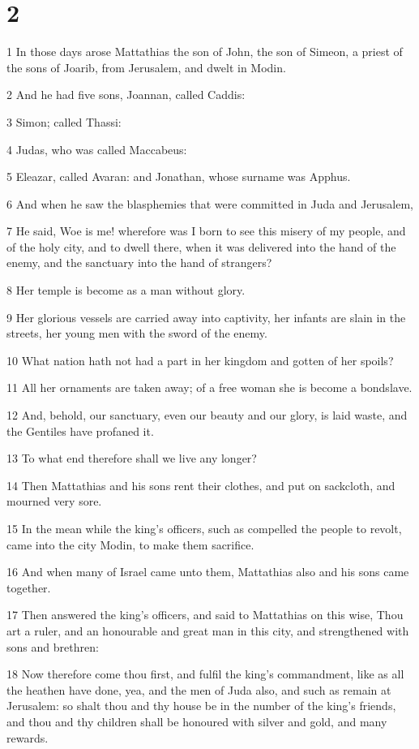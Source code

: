 \chapter{2}

\par 1 In those days arose Mattathias the son of John, the son of Simeon, a priest of the sons of Joarib, from Jerusalem, and dwelt in Modin.
\par 2 And he had five sons, Joannan, called Caddis:
\par 3 Simon; called Thassi:
\par 4 Judas, who was called Maccabeus:
\par 5 Eleazar, called Avaran: and Jonathan, whose surname was Apphus.
\par 6 And when he saw the blasphemies that were committed in Juda and Jerusalem,
\par 7 He said, Woe is me! wherefore was I born to see this misery of my people, and of the holy city, and to dwell there, when it was delivered into the hand of the enemy, and the sanctuary into the hand of strangers?
\par 8 Her temple is become as a man without glory.
\par 9 Her glorious vessels are carried away into captivity, her infants are slain in the streets, her young men with the sword of the enemy.
\par 10 What nation hath not had a part in her kingdom and gotten of her spoils?
\par 11 All her ornaments are taken away; of a free woman she is become a bondslave.
\par 12 And, behold, our sanctuary, even our beauty and our glory, is laid waste, and the Gentiles have profaned it.
\par 13 To what end therefore shall we live any longer?
\par 14 Then Mattathias and his sons rent their clothes, and put on sackcloth, and mourned very sore.
\par 15 In the mean while the king's officers, such as compelled the people to revolt, came into the city Modin, to make them sacrifice.
\par 16 And when many of Israel came unto them, Mattathias also and his sons came together.
\par 17 Then answered the king's officers, and said to Mattathias on this wise, Thou art a ruler, and an honourable and great man in this city, and strengthened with sons and brethren:
\par 18 Now therefore come thou first, and fulfil the king's commandment, like as all the heathen have done, yea, and the men of Juda also, and such as remain at Jerusalem: so shalt thou and thy house be in the number of the king's friends, and thou and thy children shall be honoured with silver and gold, and many rewards.
